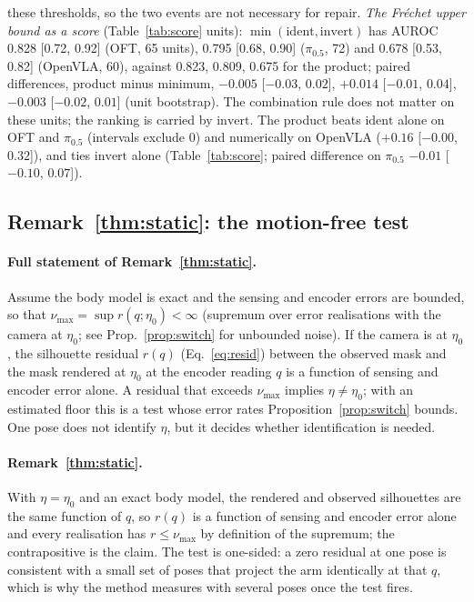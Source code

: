 \documentclass{article}
\newcommand{\ident}{\mathrm{ident}}
\newcommand{\invert}{\mathrm{invert}}
\newcommand{\pihalf}{$\pi_{0.5}$}
\begin{document}
these thresholds, so the two events are not necessary for repair. \emph{The Fr\'echet upper bound as a score}
(Table~\ref{tab:score} units): $\min(\ident, \invert)$ has AUROC 0.828 [0.72, 0.92] (OFT, 65 units), 0.795 [0.68, 0.90]
(\pihalf, 72) and 0.678 [0.53, 0.82] (OpenVLA, 60), against 0.823, 0.809, 0.675 for the product; paired differences,
product minus minimum, $-0.005$ [$-0.03$, $0.02$], $+0.014$ [$-0.01$, $0.04$], $-0.003$ [$-0.02$, $0.01$]
(unit bootstrap). The combination rule does not matter on these units; the ranking is carried by $\invert$.
The product beats $\ident$ alone on OFT and \pihalf{} (intervals exclude 0) and numerically on OpenVLA ($+0.16$
[$-0.00$, $0.32$]), and ties $\invert$ alone (Table~\ref{tab:score}; paired difference on \pihalf{} $-0.01$ [$-0.10$,
$0.07$]).

\subsection{Remark~\ref{thm:static}: the motion-free test}
\label{app:moreprops}

\paragraph{Full statement of Remark~\ref{thm:static}.}
Assume the body model is exact and the sensing and encoder errors are bounded, so that $\nu_{\max} = \sup
r(q;\eta_0) < \infty$ (supremum over error realisations with the camera at $\eta_0$; see Prop.~\ref{prop:switch} for
unbounded noise). If the camera is at $\eta_0$, the silhouette residual $r(q)$ (Eq.~\ref{eq:resid}) between the
observed mask and the mask rendered at $\eta_0$ at the encoder reading $q$ is a function of sensing and encoder error
alone. A residual that exceeds $\nu_{\max}$ implies $\eta \ne \eta_0$; with an estimated floor this is a test whose
error rates Proposition~\ref{prop:switch} bounds. One pose does not identify $\eta$, but it decides whether
identification is needed.

\paragraph{Remark~\ref{thm:static}.} With $\eta = \eta_0$ and an exact body model, the rendered and observed
silhouettes are the same function of $q$, so $r(q)$ is a function of sensing and encoder error alone and every
realisation has $r \le \nu_{\max}$ by definition of the supremum; the contrapositive is the claim. The test is
one-sided: a zero residual at one pose is consistent with a small set of poses that project the arm identically at that
$q$, which is why the method measures with several poses once the test fires.
\end{document}
